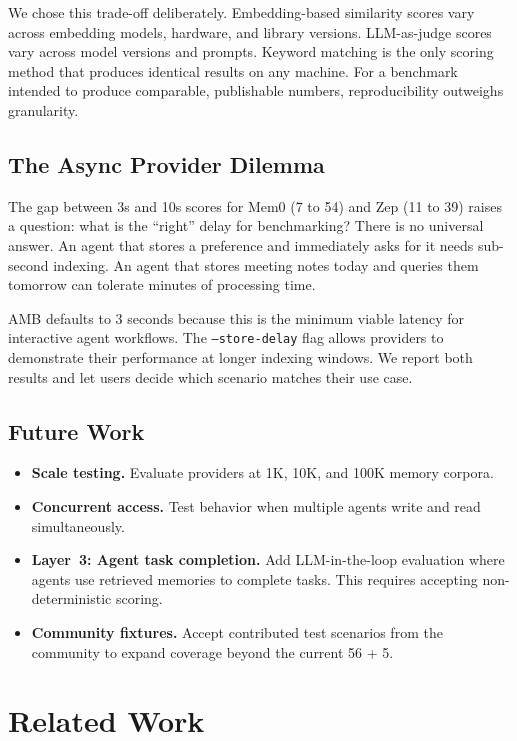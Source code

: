 \documentclass[11pt]{article}
\begin{document}
We chose this trade-off deliberately. Embedding-based similarity scores vary across embedding models, hardware, and library versions. LLM-as-judge scores vary across model versions and prompts. Keyword matching is the only scoring method that produces identical results on any machine. For a benchmark intended to produce comparable, publishable numbers, reproducibility outweighs granularity.

\subsection{The Async Provider Dilemma}

The gap between 3s and 10s scores for Mem0 (7 to 54) and Zep (11 to 39) raises a question: what is the ``right'' delay for benchmarking? There is no universal answer. An agent that stores a preference and immediately asks for it needs sub-second indexing. An agent that stores meeting notes today and queries them tomorrow can tolerate minutes of processing time.

AMB defaults to 3 seconds because this is the minimum viable latency for interactive agent workflows. The \texttt{--store-delay} flag allows providers to demonstrate their performance at longer indexing windows. We report both results and let users decide which scenario matches their use case.

\subsection{Future Work}

\begin{itemize}
    \item \textbf{Scale testing.} Evaluate providers at 1K, 10K, and 100K memory corpora.
    \item \textbf{Concurrent access.} Test behavior when multiple agents write and read simultaneously.
    \item \textbf{Layer~3: Agent task completion.} Add LLM-in-the-loop evaluation where agents use retrieved memories to complete tasks. This requires accepting non-deterministic scoring.
    \item \textbf{Community fixtures.} Accept contributed test scenarios from the community to expand coverage beyond the current 56 + 5.
\end{itemize}

\section{Related Work}
\end{document}
